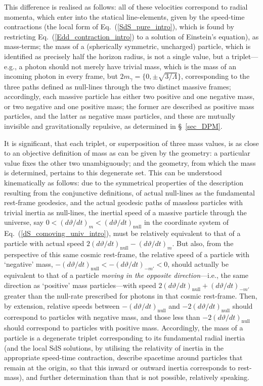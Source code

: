 This difference is realised as follows: all of these velocities correspond to radial momenta, which enter into the statical line-elements, given by the speed-time contractions (the local form of Eq.~(\ref{SdS_pure_intro}), which is found by restricting Eq.~(\ref{Edd_contraction_intro}) to a solution of Einstein's equation), as mass-terms; the mass of a (spherically symmetric, uncharged) particle, which is identified as precisely half the horizon radius, is not a single value, but a triplet---e.g., a photon should not merely have trivial mass, which is the mass of an incoming photon in every frame, but $2m_{\gamma}=\{0,\pm\sqrt{3/\Lambda}\}$, corresponding to the three paths defined as null-lines through the two distinct massive frames; accordingly, each massive particle has either two positive and one negative mass, or two negative and one positive mass; the former are described as positive mass particles, and the latter as negative mass particles, and these are mutually invisible and gravitationally repulsive, as determined in \S~\ref{sec_DPM}.

It is significant, that each triplet, or superposition of three mass values, is as close to an objective definition of mass as can be given by the geometry: a particular value fixes the other two unambiguously; and the geometry, from which the mass is determined, pertains to this degenerate set. This can be understood kinematically as follows: due to the symmetrical properties of the description resulting from the conjunctive definitions, of actual null-lines as the fundamental rest-frame geodesics, and the actual geodesic paths of massless particles with trivial inertia as null-lines, the inertial speed of a massive particle through the universe, say $0<(d\vartheta/dt)_m<(d\vartheta/dt)_{\mathrm{null}}$ in the coordinate system of Eq.~(\ref{dS_comoving_univ_intro}), must be relatively equivalent to that of a particle with actual speed $2(d\vartheta/dt)_{\mathrm{null}}-(d\vartheta/dt)_m$. But also, from the perspective of this same cosmic rest-frame, the relative speed of a particle with `negative' mass, $-(d\vartheta/dt)_{\mathrm{null}}<-(d\vartheta/dt)_{-m'}<0$, should actually be equivalent to that of a particle \textit{moving in the opposite direction}---i.e., the same direction as `positive' mass particles---with speed $2(d\vartheta/dt)_{\mathrm{null}}+(d\vartheta/dt)_{-m'}$ greater than the null-rate prescribed for photons in that cosmic rest-frame. Then, by extension, relative speeds between $-(d\vartheta/dt)_{\mathrm{null}}$ and $-2(d\vartheta/dt)_{\mathrm{null}}$ should correspond to particles with negative mass, and those less than $-2(d\vartheta/dt)_{\mathrm{null}}$ should correspond to particles with positive mass. Accordingly, the mass of a particle is a degenerate triplet corresponding to its fundamental radial inertia (and the local SdS solutions, by utilising the relativity of inertia in the appropriate speed-time contraction, describe spacetime around particles that remain at the origin, so that this inward or outward inertia corresponds to rest-mass), and further determination than that is not possible, relatively speaking.

